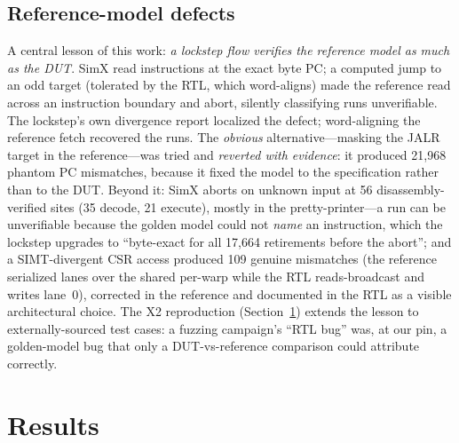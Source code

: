 \documentclass[review,12pt]{elsarticle}
\newcommand{\code}[1]{\texttt{\detokenize{#1}}}
\begin{document}
\subsection{Reference-model defects}
\label{sec:reffindings}
A central lesson of this work: \emph{a lockstep flow verifies the
	reference model as much as the DUT}. SimX read instructions at the
exact byte PC; a computed jump to an odd target (tolerated by the
RTL, which word-aligns) made the reference read across an
instruction boundary and abort, silently classifying runs
unverifiable. The lockstep's own divergence report localized the
defect; word-aligning the reference fetch recovered the runs. The
\emph{obvious} alternative---masking the JALR target in the
reference---was tried and \emph{reverted with evidence}: it produced
21{,}968 phantom PC mismatches, because it fixed the model to the
specification rather than to the DUT. Beyond it: SimX aborts on
unknown input at 56 disassembly-verified sites (35 decode, 21
execute), mostly in the pretty-printer---a run can be unverifiable
because the golden model could not \emph{name} an instruction, which
the lockstep upgrades to ``byte-exact for all 17{,}664 retirements
before the abort''; and a SIMT-divergent CSR access produced 109
genuine mismatches (the reference serialized lanes over the shared
per-warp \code{fcsr} while the RTL reads-broadcast and writes
lane~0), corrected in the reference and documented in the RTL as a
visible architectural choice. The X2 reproduction
(Section~\ref{sec:results}) extends the lesson to externally-sourced
test cases: a fuzzing campaign's ``RTL bug'' was, at our pin, a
golden-model bug that only a DUT-vs-reference comparison could
attribute correctly.

\section{Results}
\label{sec:results}
\end{document}
